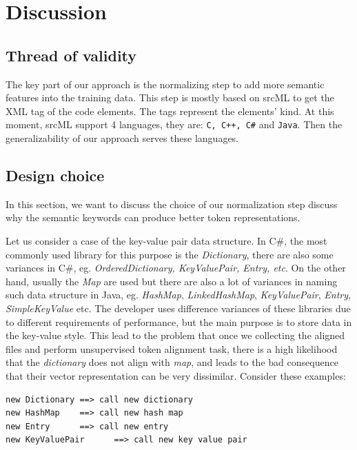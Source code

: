\section{Discussion}
\subsection{Thread of validity}

The key part of our approach is the normalizing step to add more semantic features into the training data. This step is mostly based on srcML \cite{collard2011lightweight} to get the XML tag of the code elements. The tags represent the elements' kind. At this moment, srcML support 4 languages, they are: \texttt{C, C++, C\#} and \texttt{Java}. Then the generalizability of our approach serves these languages.

\subsection{Design choice}
\label{sub:designchoicde}


In this section, we want to discuss the choice of our normalization step discuss why the semantic keywords can produce better token representations. 

Let us consider a case of the key-value pair data structure. In C\#, the most commonly used library for this purpose is the \textit{Dictionary}, there are also some variances in C\#, eg. \textit{OrderedDictionary, KeyValuePair, Entry, etc}. On the other hand, usually the \textit{Map} are used but there are also a lot of variances in naming such data structure in Java, eg. \textit{HashMap}, \textit{LinkedHashMap}, \textit{KeyValuePair}, \textit{Entry}, \textit{SimpleKeyValue} etc. The developer uses difference variances of these libraries due to different requirements of performance, but the main purpose is to store data in the key-value style. This lead to the problem that once we collecting the aligned files and perform unsupervised token alignment task, there is a high likelihood that the \textit{dictionary} does not align with \textit{map}, and leads to the bad consequence that their vector representation can be very dissimilar. Consider these examples:
\begin{lstlisting}
new Dictionary ==> call new dictionary
new HashMap    ==> call new hash map
new Entry      ==> call new entry
new KeyValuePair      ==> call new key value pair
\end{lstlisting}

